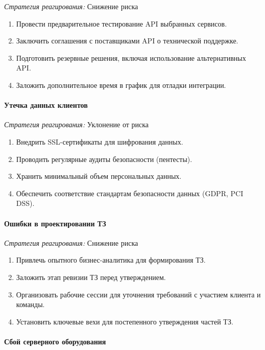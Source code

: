 \textit{Стратегия реагирования:} Снижение риска

\begin{enumerate}
	\item Провести предварительное тестирование API выбранных сервисов.
	\item Заключить соглашения с поставщиками API о технической поддержке.
	\item Подготовить резервные решения, включая использование альтернативных API.
	\item Заложить дополнительное время в график для отладки интеграции.
\end{enumerate}

\paragraph{Утечка данных клиентов}

\textit{Стратегия реагирования:} Уклонение от риска

\begin{enumerate}
	\item Внедрить SSL-сертификаты для шифрования данных.
	\item Проводить регулярные аудиты безопасности (пентесты).
	\item Хранить минимальный объем персональных данных.
	\item Обеспечить соответствие стандартам безопасности данных (GDPR, PCI DSS).
\end{enumerate}

\paragraph{Ошибки в проектировании ТЗ}

\textit{Стратегия реагирования:} Снижение риска

\begin{enumerate}
	\item Привлечь опытного бизнес-аналитика для формирования ТЗ.
	\item Заложить этап ревизии ТЗ перед утверждением.
	\item Организовать рабочие сессии для уточнения требований с участием клиента и команды.
	\item Установить ключевые вехи для постепенного утверждения частей ТЗ.
\end{enumerate}

\paragraph{Сбой серверного оборудования}

